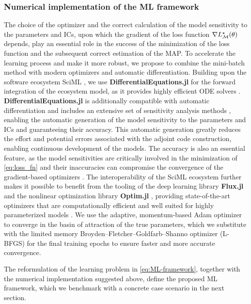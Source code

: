 \subsubsection{Numerical implementation of the ML framework}

The choice of the optimizer and the correct calculation of the model sensitivity to the parameters and ICs, upon which the gradient of the loss function $\nabla L^\star_{\mathcal{M}}(\theta)$ depends, play an essential role in the success of the minimization of the loss function and the subsequent correct estimation of the MAP. 
% 
To accelerate the learning process and make it more robust, we propose to combine the mini-batch method with modern optimizers and automatic differentiation.
%
Building upon the software ecosystem SciML \cite{Rackauckas2020a}, we use \textbf{DifferentialEquations.jl} for the forward integration of the ecosystem model, as it provides highly efficient ODE solvers \cite{Rackauckas2017}.  \textbf{DifferentialEquations.jl} is additionally compatible with automatic differentiation and includes an extensive set of sensitivity analysis methods \cite{Ma2021}, enabling the automatic generation of the model sensitivity to the parameters and ICs and guaranteeing their accuracy. This automatic generation greatly reduces the effort and potential errors associated with the adjoint code construction, enabling continuous development of the models. The accuracy is also an essential feature, as the model sensitivities are critically involved in the minimization of \cref{eq:loss_fn} and their inaccuracies can compromise the convergence of the gradient-based optimizers \cite{Gholaminejad2019}.
%
The interoperability of the SciML ecosystem further makes it possible to benefit from the tooling of the deep learning library \textbf{Flux.jl} and the nonlinear optimization library \textbf{Optim.jl} \cite{KMogensen2018}, providing state-of-the-art optimizers that are computationally efficient and well suited for highly parameterized models \cite{Ruder2016}.
% 
We use the adaptive, momentum-based Adam optimizer \cite{Kingma2014} to converge in the basin of attraction of the true parameters, which we substitute with the limited memory Broyden–Fletcher–Goldfarb–Shanno optimizer (L-BFGS) \cite{Liu1989} for the final training epochs to ensure faster and more accurate convergence.

The reformulation of the learning problem in \cref{eq:ML-framework}, together with the numerical implementation suggested above, define the proposed ML framework, which we benchmark with a concrete case scenario in the next section.

